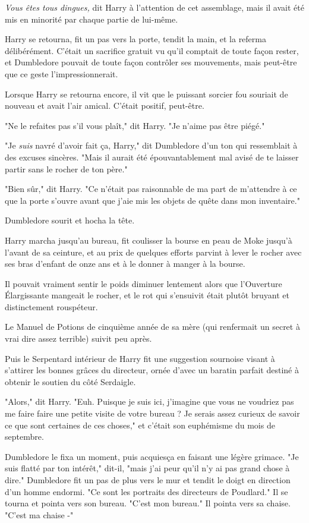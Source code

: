 \emph{Vous êtes tous dingues,}  dit Harry à l'attention de cet assemblage, mais il avait été mis en minorité par chaque partie de lui-même.

Harry se retourna, fit un pas vers la porte, tendit la main, et la referma délibérément. C'était un sacrifice gratuit vu qu'il comptait de toute façon rester, et Dumbledore pouvait de toute façon contrôler ses mouvements, mais peut-être que ce geste l'impressionnerait.

Lorsque Harry se retourna encore, il vit que le puissant sorcier fou souriait de nouveau et avait l'air amical. C'était positif, peut-être.

"Ne le refaites pas s'il vous plaît," dit Harry. "Je n'aime pas être piégé."

"Je \emph{suis}  navré d'avoir fait ça, Harry," dit Dumbledore d'un ton qui ressemblait à des excuses sincères. "Mais il aurait été épouvantablement mal avisé de te laisser partir sans le rocher de ton père."

"Bien sûr," dit Harry. "Ce n'était pas raisonnable de ma part de m'attendre à ce que la porte s'ouvre avant que j'aie mis les objets de quête dans mon inventaire."

Dumbledore sourit et hocha la tête.

Harry marcha jusqu'au bureau, fit coulisser la bourse en peau de Moke jusqu'à l'avant de sa ceinture, et au prix de quelques efforts parvint à lever le rocher avec ses bras d'enfant de onze ans et à le donner à manger à la bourse.

Il pouvait vraiment sentir le poids diminuer lentement alors que l'Ouverture Élargissante mangeait le rocher, et le rot qui s'ensuivit était plutôt bruyant et distinctement rouspéteur.

Le Manuel de Potions de cinquième année de sa mère (qui renfermait un secret à vrai dire assez terrible) suivit peu après.

Puis le Serpentard intérieur de Harry fit une suggestion sournoise visant à s'attirer les bonnes grâces du directeur, ornée d'avec un baratin parfait destiné à obtenir le soutien du côté Serdaigle.

"Alors," dit Harry. "Euh. Puisque je suis ici, j'imagine que vous ne voudriez pas me faire faire une petite visite de votre bureau ? Je serais assez curieux de savoir ce que sont certaines de ces choses," et c'était son euphémisme du mois de septembre.

Dumbledore le fixa un moment, puis acquiesça en faisant une légère grimace. "Je suis flatté par ton intérêt," dit-il, "mais j'ai peur qu'il n'y ai pas grand chose à dire." Dumbledore fit un pas de plus vers le mur et tendit le doigt en direction d'un homme endormi. "Ce sont les portraits des directeurs de Poudlard." Il se tourna et pointa vers son bureau. "C'est mon bureau." Il pointa vers sa chaise. "C'est ma chaise -"


